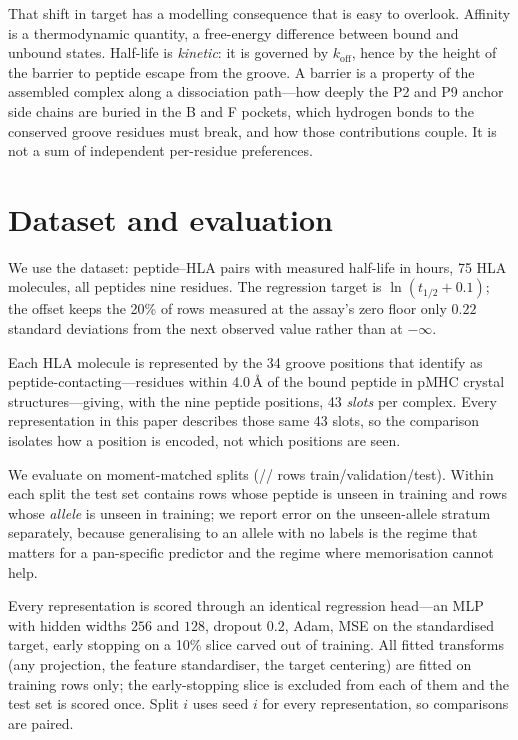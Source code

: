 \documentclass[11pt,a4paper]{article}
\begin{document}
That shift in target has a modelling consequence that is easy to overlook.
Affinity is a thermodynamic quantity, a free-energy difference between bound
and unbound states. Half-life is \emph{kinetic}: it is governed by
$k_{\mathrm{off}}$, hence by the height of the barrier to peptide escape from
the groove. A barrier is a property of the assembled complex along a
dissociation path---how deeply the P2 and P9 anchor side chains are buried in
the B and F pockets, which hydrogen bonds to the conserved groove residues must
break, and how those contributions couple. It is not a sum of independent
per-residue preferences.

\section{Dataset and evaluation}
\label{sec:data}

We use the \citet{rasmussen2016} dataset: \ntotal{} peptide--HLA pairs with
measured half-life in hours, 75 HLA molecules, all peptides nine residues. The
regression target is $\ln(t_{1/2} + 0.1)$; the offset keeps the 20\% of rows
measured at the assay's zero floor only $0.22$ standard deviations from the
next observed value rather than at $-\infty$.

Each HLA molecule is represented by the 34 groove positions that
\citet{reynisson2020} identify as peptide-contacting---residues within
4.0\,\AA{} of the bound peptide in pMHC crystal structures---giving, with the
nine peptide positions, 43 \emph{slots} per complex. Every representation in
this paper describes those same 43 slots, so the comparison isolates how a
position is encoded, not which positions are seen.

We evaluate on \nsplits{} moment-matched splits
(\ntrain{}/\nval{}/\ntest{} rows train/validation/test). Within each split the
test set contains rows whose peptide is unseen in training and rows whose
\emph{allele} is unseen in training; we report error on the unseen-allele
stratum separately, because generalising to an allele with no labels is the
regime that matters for a pan-specific predictor and the regime where
memorisation cannot help.

Every representation is scored through an identical regression head---an MLP
with hidden widths $256$ and $128$, dropout $0.2$, Adam, MSE on the
standardised target, early stopping on a 10\% slice carved out of training.
All fitted transforms (any projection, the feature standardiser, the target
centering) are fitted on training rows only; the early-stopping slice is
excluded from each of them and the test set is scored once. Split $i$ uses
seed $i$ for every representation, so comparisons are paired.
\end{document}
